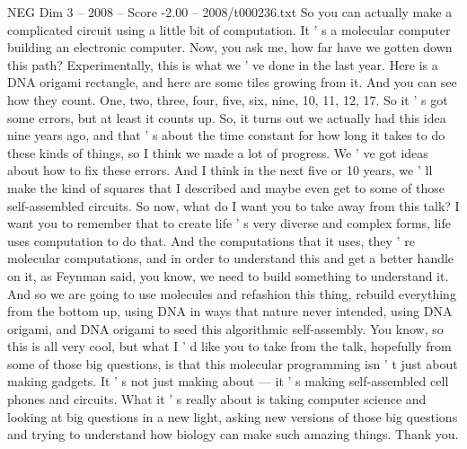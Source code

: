 \begin{textsample}{NEG Dim 3 – 2008 – Score -2.00 – 2008/t000236.txt}
So you can actually make a complicated circuit using a little bit of computation.
It ' s a molecular computer building an electronic computer.
Now, you ask me, how far have we gotten down this path?
Experimentally, this is what we ' ve done in the last year.
Here is a DNA origami rectangle, and here are some tiles growing from it.
And you can see how they count.
One, two, three, four, five, six, nine, 10, 11, 12, 17.
So it ' s got some errors, but at least it counts up.
So, it turns out we actually had this idea nine years ago, and that ' s about the time constant for how long it takes to do these kinds of things, so I think we made a lot of progress.
We ' ve got ideas about how to fix these errors.
And I think in the next five or 10 years, we ' ll make the kind of squares that I described and maybe even get to some of those self-assembled circuits.
So now, what do I want you to take away from this talk?
I want you to remember that to create life ' s very diverse and complex forms, life uses computation to do that.
And the computations that it uses, they ' re molecular computations, and in order to understand this and get a better handle on it, as Feynman said, you know, we need to build something to understand it.
And so we are going to use molecules and refashion this thing, rebuild everything from the bottom up, using DNA in ways that nature never intended, using DNA origami, and DNA origami to seed this algorithmic self-assembly.
You know, so this is all very cool, but what I ' d like you to take from the talk, hopefully from some of those big questions, is that this molecular programming isn ' t just about making gadgets.
It ' s not just making about — it ' s making self-assembled cell phones and circuits.
What it ' s really about is taking computer science and looking at big questions in a new light, asking new versions of those big questions and trying to understand how biology can make such amazing things.
Thank you.

\end{textsample}
